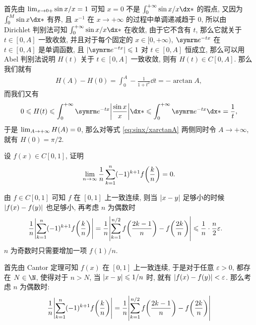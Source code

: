 \begin{exercise}[series=exer]
\begin{answer}
    首先由 $ \lim_{x \to 0+}\sin x/x = 1 $ 可知 $ x = 0 $ 不是 $ \int_{0}^{+\infty}\sin x/x \dx* $ 的瑕点, 又因为 $ \int_{0}^{M}\sin x\dx* $ 有界, 且 $ x^{-1} $ 在 $ x \to +\infty $ 的过程中单调递减趋于 $ 0 $, 所以由 Dirichlet 判别法可知 $ \int_{0}^{+\infty} \sin x/x \dx* $ 在收敛, 由于它不含有 $ t $, 那么它就关于 $ t\in [0, A] $ 一致收敛, 并且对于每个固定的 $ x \in [0, +\infty) $, $ \me^{-tx} $ 在 $ t\in[0, A] $ 是单调函数, 且 $ \abs{\me^{-tx}} \le 1 $ 对 $ t \in [0, A] $ 恒成立, 那么可以用 Abel 判别法说明 $ H(t) $ 关于 $ t \in [0, A] $ 一致收敛, 则有 $ H(t) \in C[0, A] $. 那么我们就有
    \begin{align}\label{eq:sinx/xarctanA}
      H(A) - H(0) = \int_{0}^{A} -\frac{1}{1 + t^{2}} \dd{t} = -\arctan A,
    \end{align}
    而我们又有
    \begin{align*}
      0 \le H(t) \le \int_{0}^{+\infty} \me^{-tx}\abs{\frac{\sin x}{x}} \dx* \le \int_{0}^{+\infty} \me^{-tx} \dx* = \frac{1}{t},
    \end{align*}
    于是 $ \lim_{A \to +\infty} H(A) = 0 $, 那么对等式 \eqref{eq:sinx/xarctanA} 两侧同时令 $ A \to +\infty $, 就有 $ H(0) = \pi/2 $.
  \end{answer}
  \item 设 $ f(x) \in C[0, 1] $, 证明
  \begin{align*}
    \lim_{n \to \infty} \frac{1}{n} \sum_{k=1}^{n} (-1)^{k+1} f\qty(\frac{k}{n}) = 0.
  \end{align*}
  \begin{hint}
    由 $ f \in C[0, 1] $ 可知 $ f $ 在 $ [0, 1] $ 上一致连续, 则当 $ \abs{x - y} $ 足够小的时候 $ \abs{f(x) - f(y)} $ 也足够小, 再考虑 $ n $ 为偶数时
    \begin{align*}
      \frac{1}{n} \abs{\sum_{k=1}^{n} (-1)^{k+1} f\qty(\frac{k}{n})} & = \frac{1}{n}\abs{\sum_{k = 1}^{n/2}f\qty(\frac{2k-1}{n}) - f\qty(\frac{2k}{n})} \leqslant \frac{1}{n}\cdot\frac{n}{2}\varepsilon.
    \end{align*}
    $ n $ 为奇数时只需要增加一项 $ f(1)/n $.
  \end{hint}
  \begin{answer}
    首先由 Cantor 定理可知 $ f(x) $ 在 $ [0, 1] $ 上一致连续, 于是对于任意 $ \varepsilon > 0 $, 都存在 $ N \in \N $, 使得对于 $ n > N $, 当 $ \abs{x - y} \leqslant 1/n $ 时, 就有 $ \abs{f(x) - f(y)} < \varepsilon $. 那么考虑 $ n $ 为偶数时:
    \begin{align*}
      \frac{1}{n} \abs{\sum_{k=1}^{n} (-1)^{k+1} f\qty(\frac{k}{n})} 
      & = \frac{1}{n}\abs{\sum_{k = 1}^{n/2}f\qty(\frac{2k-1}{n}) - f\qty(\frac{2k}{n})} \\

\end{align*}
\end{answer}
\end{exercise}
